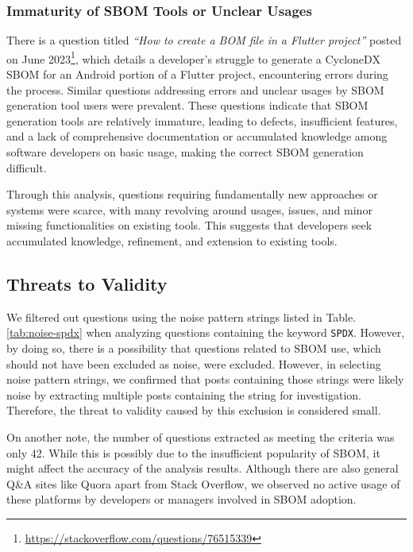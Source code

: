 \documentclass[conference]{IEEEtran}
\begin{document}
\subsubsection{Immaturity of SBOM Tools or Unclear Usages}
\label{sec:study-bugs}
There is a question titled \emph{``How to create a BOM file in a Flutter project''} posted on June 2023\footnote{\url{https://stackoverflow.com/questions/76515339}}, which details a developer's struggle to generate a CycloneDX SBOM for an Android portion of a Flutter project, encountering errors during the process. Similar questions addressing errors and unclear usages by SBOM generation tool users were prevalent. These questions indicate that SBOM generation tools are relatively immature, leading to defects, insufficient features, and a lack of comprehensive documentation or accumulated knowledge among software developers on basic usage, making the correct SBOM generation difficult.

Through this analysis, questions requiring fundamentally new approaches or systems were scarce, with many revolving around usages, issues, and minor missing functionalities on existing tools. This suggests that developers seek accumulated knowledge, refinement, and extension to existing tools.

\subsection{Threats to Validity}
\label{sec:validity}

We filtered out questions using the noise pattern strings listed in Table. \ref{tab:noise-spdx} when analyzing questions containing the keyword \verb|SPDX|. However, by doing so, there is a possibility that questions related to SBOM use, which should not have been excluded as noise, were excluded. However, in selecting noise pattern strings, we confirmed that posts containing those strings were likely noise by extracting multiple posts containing the string for investigation. Therefore, the threat to validity caused by this exclusion is considered small.

On another note, the number of questions extracted as meeting the criteria was only 42. While this is possibly due to the insufficient popularity of SBOM, it might affect the accuracy of the analysis results. Although there are also general Q\&A sites like Quora apart from Stack Overflow, we observed no active usage of these platforms by developers or managers involved in SBOM adoption.
\end{document}
